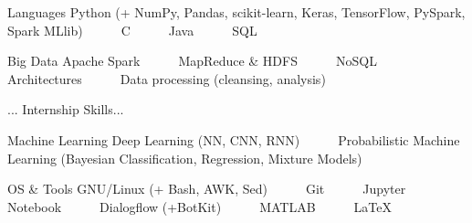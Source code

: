 

\begin{cvskills}

  \cvskill
    {Languages} %
    {Python (+ NumPy, Pandas, scikit-learn, Keras, TensorFlow, PySpark, Spark MLlib)~~~\textbullet~~~C~~~\textbullet~~~Java~~~\textbullet~~~SQL} %

  \cvskill
    {Big Data} %
    {Apache Spark~~~\textbullet~~~MapReduce \& HDFS~~~\textbullet~~~NoSQL Architectures~~~\textbullet~~~Data processing (cleansing, analysis)} %
    
\cvskill
    {...} %
    {Internship Skills...} %

  \cvskill
    {Machine Learning} %
    {Deep Learning (NN, CNN, RNN)~~~\textbullet~~~Probabilistic Machine Learning (Bayesian Classification, Regression, Mixture Models)} %

  \cvskill
    {OS \& Tools} %
    {GNU/Linux (+ Bash, AWK, Sed)~~~\textbullet~~~Git~~~\textbullet~~~Jupyter Notebook~~~\textbullet~~~Dialogflow (+BotKit)~~~\textbullet~~~MATLAB~~~\textbullet~~~LaTeX} %

\end{cvskills}
